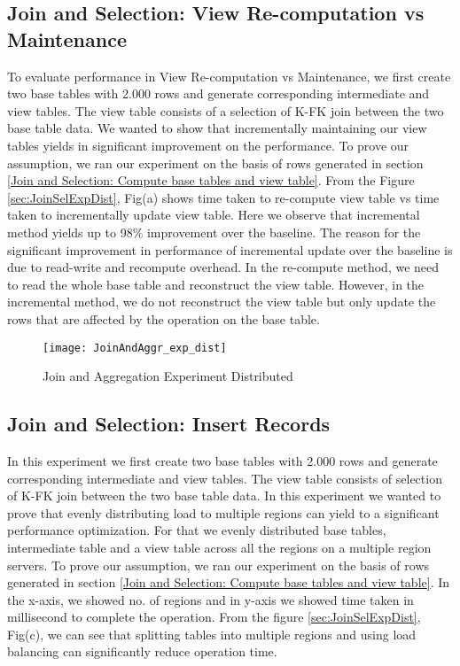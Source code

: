 \documentclass[11pt,a4paper,bibtotoc,idxtotoc,headsepline,footsepline,footexclude,BCOR12mm,DIV13]{scrbook}
\begin{document}
\subsection{Join and Selection: View Re-computation vs Maintenance}
\label{Join and Selection: View Re-computation vs Maintenance Distributed}

To evaluate performance in View Re-computation vs Maintenance, we first create two base tables with 2.000 rows and generate corresponding intermediate and view tables. The view table consists of a selection of K-FK join between the two base table data. We wanted to show that incrementally maintaining our view tables yields in significant improvement on the performance. To prove our assumption, we ran our experiment on the basis of rows generated in section \ref{Join and Selection: Compute base tables and view table}. From the Figure \ref{sec:JoinSelExpDist}, Fig(a) shows time taken to re-compute view table vs time taken to incrementally update view table. Here we observe that incremental method yields up to 98\% improvement over the baseline. The reason for the significant improvement in performance of incremental update over the baseline is due to read-write and recompute overhead. In the re-compute method, we need to read the whole base table and
reconstruct the view table. However, in the incremental method, we do not reconstruct the view table but only update the rows that are affected by the operation on the base table. 

\begin{figure}
	\centering
	\texttt{[image: JoinAndAggr\_exp\_dist]}
	\caption{Join and Aggregation Experiment Distributed}
	\label{sec:JoinAggrExpDist}
	
\end{figure} 
\newpage



\subsection{Join and Selection: Insert Records}
\label{Join and Selection: Insert Records Distributed}

In this experiment we first create two base tables with 2.000 rows and generate corresponding intermediate and view tables. The view table consists of selection of K-FK join between the two base table data. In this experiment we wanted to prove that evenly distributing load to multiple regions can yield to a significant performance optimization. For that we evenly distributed base tables, intermediate table and a view table across all the regions on a multiple region servers.  
To prove our assumption, we ran our experiment on the basis of rows generated in section \ref{Join and Selection: Compute base tables and view table}. In the x-axis, we showed no. of regions and in y-axis we showed time taken in millisecond to complete the operation. From the figure \ref{sec:JoinSelExpDist}, Fig(c), we can see that splitting tables into multiple regions and using load balancing can significantly reduce operation time.
\end{document}

